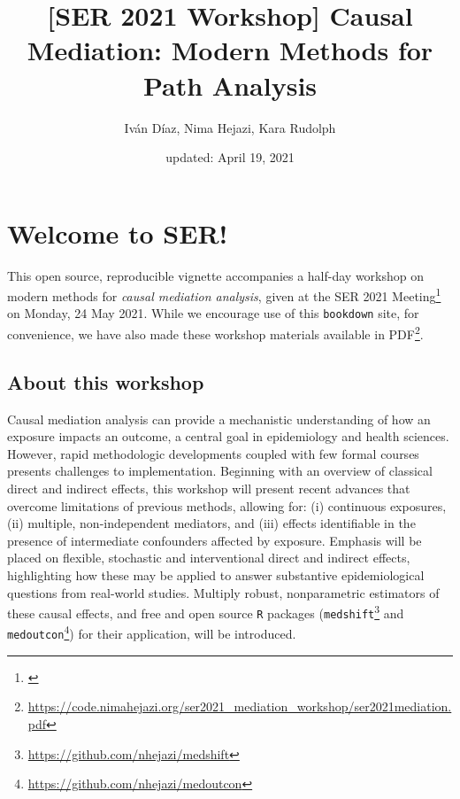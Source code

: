 \documentclass[
  12pt, krantz2,
]{book}
\title{{[}SER 2021 Workshop{]} Causal Mediation: Modern Methods for Path Analysis}
\author{Iván Díaz, Nima Hejazi, Kara Rudolph}
\date{updated: April 19, 2021}
\renewcommand{\href}[2]{#2\footnote{\url{#1}}}
\theoremstyle{definition}
\theoremstyle{definition}
\theoremstyle{definition}
\newcommand{\1}{\mathbbm{1}}
\begin{document}
\maketitle


\thispagestyle{empty}

\begin{center}

\end{center}

\setlength{\abovedisplayskip}{-5pt}
\setlength{\abovedisplayshortskip}{-5pt}

{
\hypersetup{linkcolor=}
\setcounter{tocdepth}{1}
\tableofcontents
}
\listoftables
\listoffigures
\hypertarget{welcome-to-ser}{%
\chapter*{Welcome to SER!}\label{welcome-to-ser}}


This open source, reproducible vignette accompanies a half-day workshop on
modern methods for \emph{causal mediation analysis}, given at the \href{}{SER 2021
Meeting} on Monday, 24 May 2021. While we encourage use of this \texttt{bookdown}
site, for convenience, we have also made these workshop materials \href{https://code.nimahejazi.org/ser2021_mediation_workshop/ser2021mediation.pdf}{available in
PDF}.

\hypertarget{about}{%
\section{About this workshop}\label{about}}

Causal mediation analysis can provide a mechanistic understanding of how an
exposure impacts an outcome, a central goal in epidemiology and health sciences.
However, rapid methodologic developments coupled with few formal courses
presents challenges to implementation. Beginning with an overview of classical
direct and indirect effects, this workshop will present recent advances that
overcome limitations of previous methods, allowing for: (i) continuous
exposures, (ii) multiple, non-independent mediators, and (iii) effects
identifiable in the presence of intermediate confounders affected by exposure.
Emphasis will be placed on flexible, stochastic and interventional direct and
indirect effects, highlighting how these may be applied to answer substantive
epidemiological questions from real-world studies. Multiply robust,
nonparametric estimators of these causal effects, and free and open source \texttt{R}
packages (\href{https://github.com/nhejazi/medshift}{\texttt{medshift}} and
\href{https://github.com/nhejazi/medoutcon}{\texttt{medoutcon}}) for their application, will
be introduced.
\end{document}
